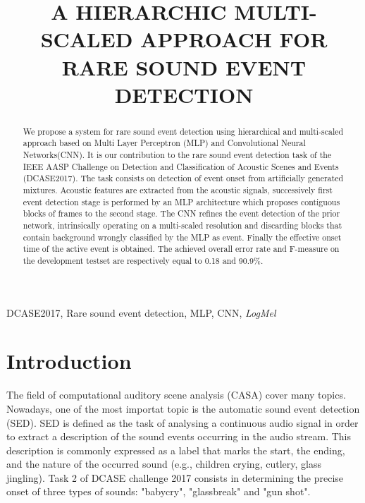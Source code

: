 \documentclass{article}
\title{A HIERARCHIC MULTI-SCALED APPROACH FOR RARE SOUND EVENT DETECTION}
\begin{document}
\ninept
\maketitle

\begin{sloppy}

\begin{abstract}
We propose a system for rare sound event detection using hierarchical and multi-scaled approach based on Multi Layer Perceptron (MLP) and Convolutional Neural Networks(CNN). 
It is our contribution to the rare sound event detection task of the IEEE AASP Challenge on  Detection and Classification of Acoustic Scenes and Events (DCASE2017). The task consists on detection of event onset from artificially generated mixtures. Acoustic features are extracted from the acoustic signals, successively first event detection stage is performed by an MLP architecture which proposes contiguous blocks of frames to the second stage. The CNN refines the event detection of the prior network, intrinsically operating on a multi-scaled resolution and discarding blocks that contain background wrongly classified by the MLP as event. Finally the effective onset time of the active event is obtained.
The achieved overall error rate and F-measure on the development testset are respectively equal to 0.18 and 90.9\%.
\end{abstract}

\begin{keywords}
DCASE2017, Rare sound event detection, MLP, CNN, \textit{LogMel}
\end{keywords}


\section{Introduction}
\label{sec:intro}

\label{sec:format}


The field of computational auditory scene analysis (CASA) cover many topics. Nowadays, one of the most importat topic is the automatic sound event detection (SED). SED is defined as the task of analysing a continuous audio
signal in order to extract a description of the sound events
occurring in the audio stream. This description is commonly
expressed as a label that marks the start, the ending, and the
nature of the occurred sound (e.g., children crying, cutlery,
glass jingling).
Task 2 of DCASE challenge 2017 \cite{dcase2017web} consists in determining the precise onset of three types of sounds: "babycry", "glassbreak" and "gun shot". 


\end{sloppy}
\end{document}
